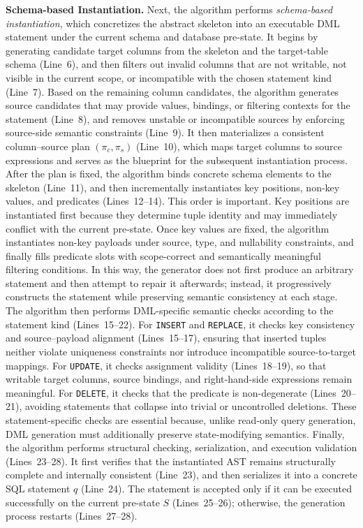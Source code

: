 \textbf{Schema-based Instantiation.}
Next, the algorithm performs \emph{schema-based instantiation}, which concretizes the abstract skeleton into an executable DML statement under the current schema and database pre-state.
It begins by generating candidate target columns from the skeleton and the target-table schema (Line~6), and then filters out invalid columns that are not writable, not visible in the current scope, or incompatible with the chosen statement kind (Line~7).
Based on the remaining column candidates, the algorithm generates source candidates that may provide values, bindings, or filtering contexts for the statement (Line~8), and removes unstable or incompatible sources by enforcing source-side semantic constraints (Line~9).
It then materializes a consistent column--source plan $(\pi_c,\pi_s)$ (Line~10), which maps target columns to source expressions and serves as the blueprint for the subsequent instantiation process.
After the plan is fixed, the algorithm binds concrete schema elements to the skeleton (Line~11), and then incrementally instantiates key positions, non-key values, and predicates (Lines~12--14).
This order is important.
Key positions are instantiated first because they determine tuple identity and may immediately conflict with the current pre-state.
Once key values are fixed, the algorithm instantiates non-key payloads under source, type, and nullability constraints, and finally fills predicate slots with scope-correct and semantically meaningful filtering conditions.
In this way, the generator does not first produce an arbitrary statement and then attempt to repair it afterwards; instead, it progressively constructs the statement while preserving semantic consistency at each stage.
The algorithm then performs DML-specific semantic checks according to the statement kind (Lines~15--22).
For \texttt{INSERT} and \texttt{REPLACE}, it checks key consistency and source--payload alignment (Lines~15--17), ensuring that inserted tuples neither violate uniqueness constraints nor introduce incompatible source-to-target mappings.
For \texttt{UPDATE}, it checks assignment validity (Lines~18--19), so that writable target columns, source bindings, and right-hand-side expressions remain meaningful.
For \texttt{DELETE}, it checks that the predicate is non-degenerate (Lines~20--21), avoiding statements that collapse into trivial or uncontrolled deletions.
These statement-specific checks are essential because, unlike read-only query generation, DML generation must additionally preserve  state-modifying semantics.
Finally, the algorithm performs structural checking, serialization, and execution validation (Lines~23--28).
It first verifies that the instantiated AST remains structurally complete and internally consistent (Line~23), and then serializes it into a concrete SQL statement $q$ (Line~24).
The statement is accepted only if it can be executed successfully on the current pre-state $S$ (Lines~25--26); otherwise, the generation process restarts (Lines~27--28).

